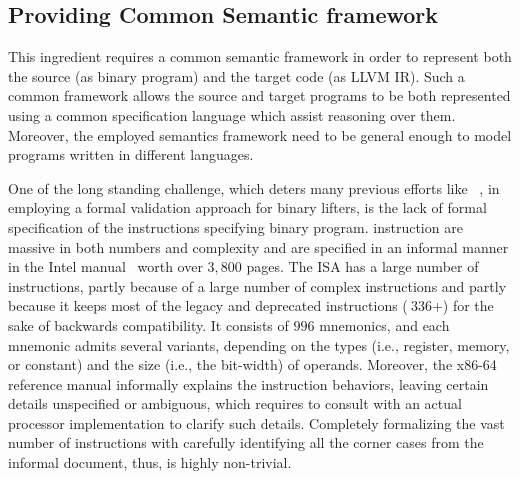 \subsection{Providing Common Semantic framework} This ingredient requires a
common semantic framework in order to represent both the source (as \ISA binary
    program) and the target code (as LLVM IR). Such a common framework allows
the source and target programs to be both represented using a common
specification language which assist reasoning over them. Moreover, the employed
semantics framework need to be general enough to model programs written in
different languages.

One of the long standing challenge, which deters many previous efforts like
~\cite{ASE2017}, in employing a formal validation approach for binary
lifters, is the lack of formal specification of the \ISA instructions
specifying binary program. \ISA instruction are massive in both numbers and
complexity and are specified in an informal manner in the Intel
manual~\cite{IntelManual} worth over $3,800$ pages. The \ISA ISA has a large
number of instructions, partly because of a large number of complex
  instructions and partly because it keeps most of the legacy and deprecated
  instructions ($~336$+) for the sake of backwards compatibility. It consists
  of $996$ mnemonics, and each mnemonic admits several variants, depending on
  the types (i.e., register, memory, or constant) and the size (i.e., the
      bit-width) of operands. Moreover, the x86-64 reference manual informally
  explains the instruction behaviors, leaving certain details unspecified or
  ambiguous, which requires  to consult with an actual processor implementation
  to clarify such details. Completely formalizing the vast number of
  instructions with carefully identifying all the corner cases from the
  informal document, thus, is highly non-trivial.

